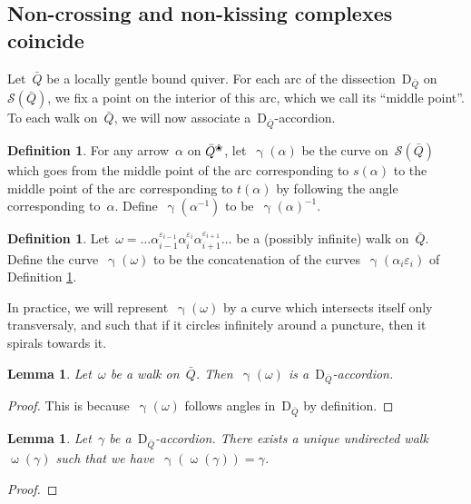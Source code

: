 \documentclass{amsart}
\newtheorem{lemma}[theorem]{Lemma}
\theoremstyle{definition}
\newtheorem{definition}[theorem]{Definition}
\newcommand{\pierreguy}[1]{\todo[color=green!30]{#1 \\ \hfill --- PG.}}
\newcommand{\blossom}{^\text{\ding{96}}} %
\newcommand{\walk}{\operatorname{\omega}} %
\newcommand{\surface}{\mathcal{S}} %
\newcommand{\dissection}{\mathrm{D}} %
\newcommand{\curveof}{\operatorname{\gamma}} %
\begin{document}
\subsection{Non-crossing and non-kissing complexes coincide}

Let~$\bar Q$ be a locally gentle bound quiver.
For each arc of the dissection~$\dissection_{\bar Q}$ on~$\surface(\bar Q)$, we fix a point on the interior of this arc, which we call its ``middle point''.
To each walk on~$\bar Q$, we will now associate a~$\dissection_{\bar Q}$-accordion.

\begin{definition}
\label{def:curveOfAnArrow}
For any arrow~$\alpha$ on $\bar Q\blossom$, let~$\curveof(\alpha)$ be the curve on~$\surface(\bar Q)$ which goes from the middle point of the arc corresponding to $s(\alpha)$ to the middle point of the arc corresponding to $t(\alpha)$ by following the angle corresponding to~$\alpha$.
Define~$\curveof(\alpha^{-1})$ to be~$\curveof(\alpha)^{-1}$.
\end{definition}


\begin{definition}
\label{def:curveOfAWalk}
Let~$\omega = \ldots \alpha_{i-1}^{\varepsilon_{i-1}}\alpha_{i}^{\varepsilon_i}\alpha_{i+1}^{\varepsilon_{i+1}} \ldots$ be a (possibly infinite) walk on~$\bar Q$. 
Define the curve~$\curveof(\omega)$ to be the concatenation of the curves~$\curveof(\alpha_i{\varepsilon_{i}})$ of Definition \ref{def:curveOfAnArrow}.
\end{definition}

In practice, we will represent~$\curveof(\omega)$ by a curve which intersects itself only transversaly, and such that if it circles infinitely around a puncture, then it spirals towards it.

\begin{lemma}
\label{lemm:curveOfAWalkIsAccordion}
Let~$\omega$ be a walk on~$\bar Q$.  Then~$\curveof(\omega)$ is a~$\dissection_{\bar Q}$-accordion.
\end{lemma}
\begin{proof}
 This is because~$\curveof(\omega)$ follows angles in~$\dissection_{\bar Q}$ by definition.
\end{proof}

\begin{lemma}
\label{lemm:accordionsAreCurvesOfWalks}
Let~$\gamma$ be a~$\dissection_{\bar Q}$-accordion.  There exists a unique undirected walk~$\walk(\gamma)$ such that we have~$\curveof(\walk(\gamma)) = \gamma$.
\end{lemma}
\begin{proof}
 \pierreguy{TO DO}
\end{proof}
\end{document}
